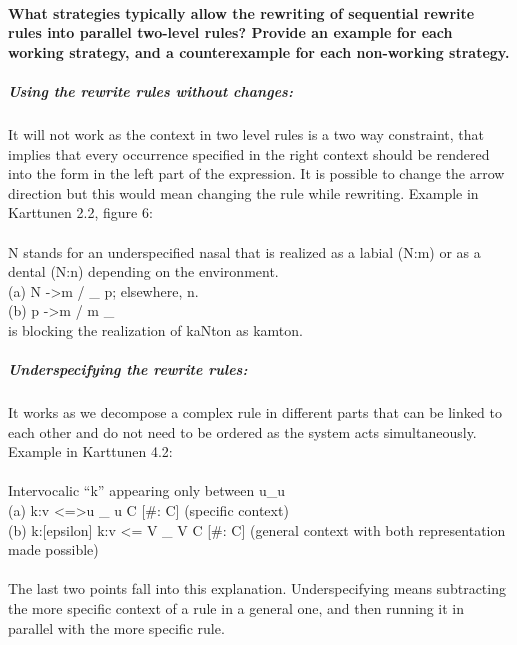 \documentclass{report}
\begin{document}
\paragraph{What strategies typically allow the rewriting of sequential rewrite rules into parallel two-level rules? Provide an example for each working strategy, and a counterexample for each non-working strategy.}
\subparagraph{Using the rewrite rules without changes:} 
It will not work as the context in two level rules is a two way constraint, that implies that every occurrence specified in the right context should be rendered into the form in the left part of the expression. It is possible to change the arrow direction but this would mean changing the rule while rewriting. Example in Karttunen 2.2, figure 6: \\
\\
N stands for an underspecified nasal that is realized as a labial (N:m) or as a dental (N:n) depending on the environment.\\
(a) N -\textgreater m / \_ p; elsewhere, n. \\
(b) p -\textgreater m / m \_ \\
is blocking the realization of kaNton as kamton.
\subparagraph{Underspecifying the rewrite rules:}
It works as we decompose a complex rule in different parts that can be linked to each other and do not need to be ordered as the system acts simultaneously. Example in Karttunen 4.2: \\
\\
Intervocalic “k” appearing only between u\_u \\
(a) k:v \textless=\textgreater  u \_ u C [\#:  C] (specific context) \\
(b) k:[epsilon]  k:v \textless= V \_ V C [\#:  C] (general context with both representation made possible) \\
\\
The last two points fall into this explanation. Underspecifying means subtracting the more specific context of a rule in a general one, and then running it in parallel with the more specific rule.
\end{document}
